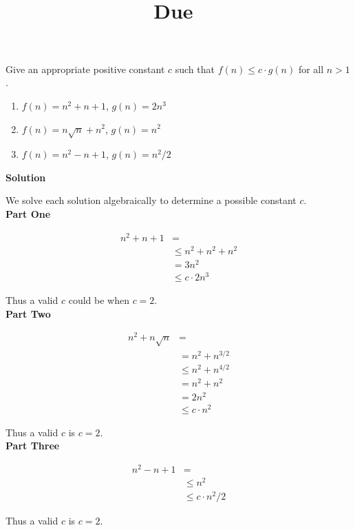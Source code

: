 \documentclass{article}
\title{
    \vspace{2in}
    \textmd{\textbf{\hmwkClass}}\\
    \textmd{\textbf{\hmwkTitle}}\\
    \normalsize\vspace{0.1in}\small{Due\ \hmwkDueDate}\\
    \vspace{3in}
}
\author{\textbf{\hmwkAuthorName}}
\date{}
\begin{document}
\maketitle

\pagebreak

\iffalse
\begin{homeworkProblem}
    Give an appropriate positive constant \(c\) such that \(f(n) \leq c \cdot
    g(n)\) for all \(n > 1\).

    \begin{enumerate}
        \item \(f(n) = n^2 + n + 1\), \(g(n) = 2n^3\)
        \item \(f(n) = n\sqrt{n} + n^2\), \(g(n) = n^2\)
        \item \(f(n) = n^2 - n + 1\), \(g(n) = n^2 / 2\)
    \end{enumerate}

    \textbf{Solution}

    We solve each solution algebraically to determine a possible constant
    \(c\).
    \\

    \textbf{Part One}

    \[
        \begin{split}
            n^2 + n + 1 &=
            \\
            &\leq n^2 + n^2 + n^2
            \\
            &= 3n^2
            \\
            &\leq c \cdot 2n^3
        \end{split}
    \]

    Thus a valid \(c\) could be when \(c = 2\).
    \\

    \textbf{Part Two}

    \[
        \begin{split}
            n^2 + n\sqrt{n} &=
            \\
            &= n^2 + n^{3/2}
            \\
            &\leq n^2 + n^{4/2}
            \\
            &= n^2 + n^2
            \\
            &= 2n^2
            \\
            &\leq c \cdot n^2
        \end{split}
    \]

    Thus a valid \(c\) is \(c = 2\).
    \\

    \textbf{Part Three}

    \[
        \begin{split}
            n^2 - n + 1 &=
            \\
            &\leq n^2
            \\
            &\leq c \cdot n^2/2
        \end{split}
    \]

    Thus a valid \(c\) is \(c = 2\).

\end{homeworkProblem}
\end{document}
